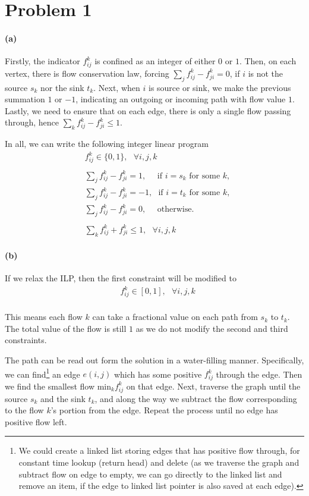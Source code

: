 \documentclass[12pt]{article}
\begin{document}
\section*{Problem 1}
\paragraph{(a)} Firstly, the indicator $f_{ij}^k$ is confined as an integer of either $0$ or $1$. Then, on each vertex, there is flow conservation law, forcing $\sum_j f_{ij}^k - f_{ji}^k = 0$, if $i$ is not the source $s_k$ nor the sink $t_k$. Next, when $i$ is source or sink, we make the previous summation $1$ or $-1$, indicating an outgoing or incoming path with flow value $1$. Lastly, we need to ensure that on each edge, there is only a single flow passing through, hence $\sum_k f_{ij}^k - f_{ji}^k \leq 1$. 

In all, we can write the following integer linear program
\begin{align*}
&f_{ij}^k \in \{0, 1\}, \:\:\: \forall i,j, k\\
\\
&\sum_j f_{ij}^k - f_{ji}^k = 1, \:\:\:\:\:\: \text{if } i=s_k \text{ for some } k,\\
&\sum_j f_{ij}^k - f_{ji}^k = -1, \:\:\: \text{if } i=t_k \text{ for some } k,\\
&\sum_j f_{ij}^k - f_{ji}^k = 0, \:\:\:\:\:\: \text{otherwise}.\\
\\
&\sum_k f_{ij}^k + f_{ji}^k \leq 1, \:\:\: \forall i,j,k
\end{align*}

\paragraph{(b)} If we relax the ILP, then the first constraint will be modified to
\begin{align*}
&f_{ij}^k \in [0, 1], \:\:\: \forall i,j, k\\
\end{align*}

This means each flow $k$ can take a fractional value on each path from $s_k$ to $t_k$. The total value of the flow is still $1$ as we do not modify the second and third constraints. 

The path can be read out form the solution in a water-filling manner. Specifically, we can find\footnote{We could create a linked list storing edges that has positive flow through, for constant time lookup (return head) and delete (as we traverse the graph and subtract flow on edge to empty, we can go directly to the linked list and remove an item, if the edge to linked list pointer is also saved at each edge).} an edge $e(i, j)$ which has some positive $f_{ij}^k$ through the edge. Then we find the smallest flow min$_k f_{ij}^k$ on that edge. Next, traverse the graph until the source $s_k$ and the sink $t_k$, and along the way we subtract the flow corresponding to the flow $k$'s portion from the edge. Repeat the process until no edge has positive flow left. 
	
\end{document}
